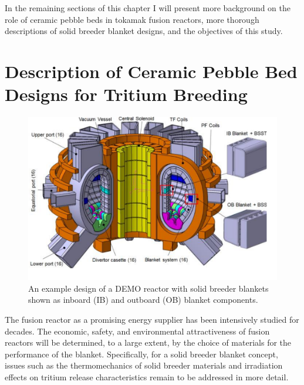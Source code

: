 In the remaining sections of this chapter I will present more background on the role of ceramic pebble beds in tokamak fusion reactors, more thorough descriptions of solid breeder blanket designs, and the objectives of this study.


















\section{Description of Ceramic Pebble Bed Designs for Tritium Breeding}
\begin{figure}[ht]
	\centering
	\includegraphics[width=\singleimagewidth]{figures/demo} 
	\caption{An example design of a DEMO reactor with solid breeder blankets shown as inboard (IB) and outboard (OB) blanket components.}
	\label{fig:demo}
\end{figure}


The fusion reactor as a promising energy supplier has been intensively studied for decades. The economic, safety, and environmental attractiveness of fusion reactors will be determined, to a large extent, by the choice of materials for the performance of the blanket. Specifically, for a solid breeder blanket concept, issues such as the thermomechanics of solid breeder materials and irradiation effects on tritium release characteristics remain to be addressed in more detail. %

